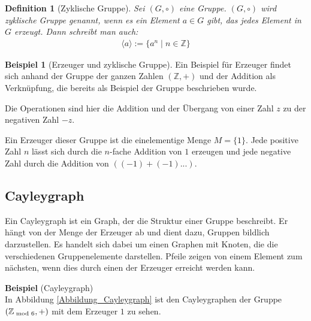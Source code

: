 \documentclass[12pt,a4paper, usenames, dvipsnames]{article}
\theoremstyle{mystyle}
\newtheorem{definition}{Definition}
\theoremstyle{definition}
\newtheorem{bsp}{Beispiel}[definition]
\begin{document}
\begin{definition}[Zyklische Gruppe]
Sei $(G, \circ)$ eine Gruppe. $(G, \circ)$ wird zyklische Gruppe genannt, wenn es ein Element $a \in G$ gibt, das jedes Element in $G$ erzeugt. Dann schreibt man auch:
\begin{align*}
\langle a \rangle := \{ a^n \mid n \in \mathbb{Z} \}
\end{align*}

\end{definition}


\begin{bsp}[Erzeuger und zyklische Gruppe]

Ein Beispiel für Erzeuger findet sich anhand der Gruppe der ganzen Zahlen $(\mathbb{Z},+)$ und der Addition als Verknüpfung, die bereits als Beispiel der Gruppe beschrieben wurde.

Die Operationen sind hier die Addition und der Übergang von einer Zahl $z$ zu der negativen Zahl $-z$.

Ein Erzeuger dieser Gruppe ist die einelementige Menge $M = \{ 1 \}$. Jede positive Zahl $n$ lässt sich durch die $n$-fache Addition von $1$ erzeugen und jede negative Zahl durch  die Addition von $((-1)+(-1)...)$. 

\end{bsp}
%
%
%
%
%
%
%
%
%
\subsection{Cayleygraph} 
\label{Abschnitt_Cayleygraph}
Ein Cayleygraph ist ein Graph, der die Struktur einer Gruppe beschreibt. Er hängt von der Menge der Erzeuger ab und dient dazu, Gruppen bildlich darzustellen.
Es handelt sich dabei um einen Graphen mit Knoten, die die verschiedenen Gruppenelemente darstellen. Pfeile zeigen von einem Element zum nächsten, wenn dies durch einen der Erzeuger erreicht werden kann. \cite{AT}

\textbf{Beispiel} (Cayleygraph) \\
In Abbildung \ref{Abbildung_Cayleygraph} ist den Cayleygraphen der Gruppe $(\mathbb{Z}_{\hspace*{-0.3em}\mod 6}, +)$ mit dem Erzeuger $1$ zu sehen.
\end{document}
